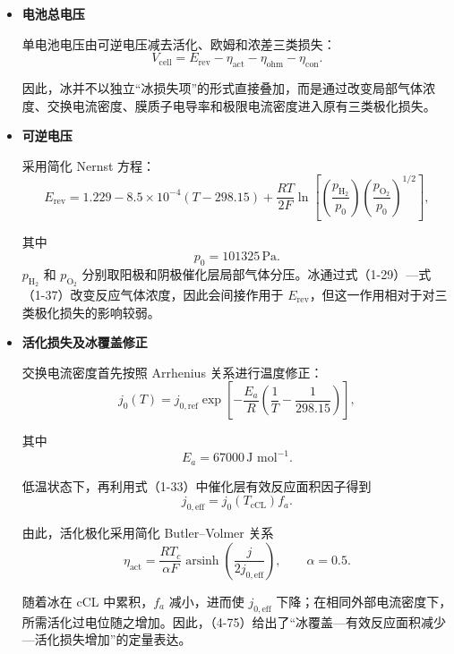 \documentclass[bwprint]{gmcmthesis}
\numberwithin{figure}{section}
\begin{document}
\begin{itemize}
\renewcommand{\labelitemi}{$\blacktriangleright$}
\item \textbf {电池总电压}

 单电池电压由可逆电压减去活化、欧姆和浓差三类损失：
\begin{equation}
V_{\text{cell}} = E_{\text{rev}} - \eta_{\text{act}} - \eta_{\text{ohm}} - \eta_{\text{con}}. \tag{4-72}
\end{equation}

 因此，冰并不以独立“冰损失项”的形式直接叠加，而是通过改变局部气体浓度、交换电流密度、膜质子电导率和极限电流密度进入原有三类极化损失。

\item \textbf {可逆电压}

 采用简化 Nernst 方程：
\begin{equation}
E_{\text{rev}} = 1.229 - 8.5 \times 10^{-4}(T - 298.15) + \frac{RT}{2F} \ln \left[ \left( \frac{p_{\text{H}_2}}{p_0} \right) \left( \frac{p_{\text{O}_2}}{p_0} \right)^{1/2} \right], \tag{4-73}
\end{equation}

 其中
\[
p_0 = 101325 \, \text{Pa}.
\]
\(p_{\text{H}_2}\) 和 \(p_{\text{O}_2}\) 分别取阳极和阴极催化层局部气体分压。冰通过式（1-29）—式（1-37）改变反应气体浓度，因此会间接作用于 \(E_{\text{rev}}\)，但这一作用相对于对三类极化损失的影响较弱。


\item \textbf {活化损失及冰覆盖修正}

交换电流密度首先按照 Arrhenius 关系进行温度修正：
\begin{equation}
j_0(T) = j_{0,\text{ref}} \exp \left[ -\frac{E_a}{R} \left( \frac{1}{T} - \frac{1}{298.15} \right) \right], \tag{4-74}
\end{equation}

 其中
\[
E_a = 67000 \, \text{J mol}^{-1}.
\]

 低温状态下，再利用式（1-33）中催化层有效反应面积因子得到
\[
j_{0,\text{eff}} = j_0(T_{\text{cCL}}) f_a.
\]

 由此，活化极化采用简化 Butler--Volmer 关系
\begin{equation}
\eta_{\text{act}} = \frac{RT_c}{\alpha F} \operatorname{arsinh} \left( \frac{j}{2j_{0,\text{eff}}} \right), \qquad \alpha = 0.5. \tag{4-75}
\end{equation}

 随着冰在 cCL 中累积，\(f_a\) 减小，进而使 \(j_{0,\text{eff}}\) 下降；在相同外部电流密度下，所需活化过电位随之增加。因此，（4-75）给出了“冰覆盖—有效反应面积减少—活化损失增加”的定量表达。




\end{itemize}
\end{document}
